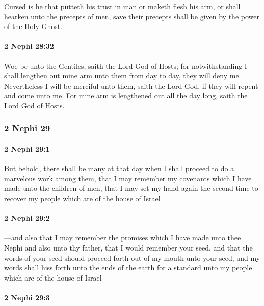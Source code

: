 			Cursed is he that putteth his trust in man or maketh flesh his arm,
			or shall hearken unto the precepts of men,
			save their precepts shall be given by the power of the Holy Ghost.

		\paragraph{2 Nephi 28:32} %
			\label{2NEPHI-28-32}

			Woe be unto the Gentiles, saith the Lord God of Hosts;
			for notwithstanding I shall lengthen out mine arm unto them from day to day,
			they will deny me.
			Nevertheless I will be merciful unto them, saith the Lord God,
			if they will repent and come unto me.
			For mine arm is lengthened out all the day long, saith the Lord God of Hosts.

	\subsubsection{2 Nephi 29} %
		\label{2NEPHI-29}
		
		\paragraph{2 Nephi 29:1} %
			\label{2NEPHI-29-1}

			But behold, there shall be many at that day
			when I shall proceed to do a marvelous work among them,
			that I may remember my covenants which I have made unto the children of men,
			that I may set my hand again the second time
			to recover my people which are of the house of Israel

		\paragraph{2 Nephi 29:2} %
			\label{2NEPHI-29-2}

			---and also that I may remember the promises
			which I have made unto thee Nephi and also unto thy father,
			that I would remember your seed,
			and that the words of your seed should proceed forth
			out of my mouth unto your seed,
			and my words shall hiss forth unto the ends of the earth
			for a standard unto my people which are of the house of Israel---

		\paragraph{2 Nephi 29:3} %
			\label{2NEPHI-29-3}

